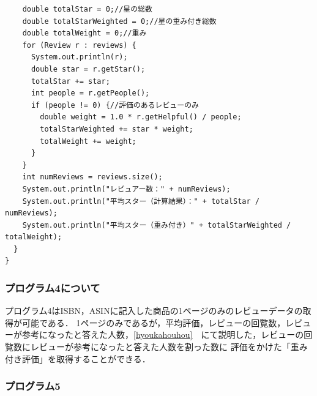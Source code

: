 \begin{lstlisting}
    double totalStar = 0;//星の総数
    double totalStarWeighted = 0;//星の重み付き総数
    double totalWeight = 0;//重み
    for (Review r : reviews) {
      System.out.println(r);
      double star = r.getStar();
      totalStar += star;
      int people = r.getPeople();
      if (people != 0) {//評価のあるレビューのみ
        double weight = 1.0 * r.getHelpful() / people;
        totalStarWeighted += star * weight;
        totalWeight += weight;
      }
    }
    int numReviews = reviews.size();
    System.out.println("レビュアー数：" + numReviews);
    System.out.println("平均スター（計算結果）：" + totalStar / numReviews);
    System.out.println("平均スター（重み付き）" + totalStarWeighted / totalWeight);
  }
}

\end{lstlisting}

\subsubsection{プログラム4について}

プログラム4はISBN，ASINに記入した商品の1ページのみのレビューデータの取得が可能である．
1ページのみであるが，平均評価，レビューの回覧数，レビューが参考になったと答えた人数，\ref{hyoukahouhou}　にて説明した，レビューの回覧数にレビューが参考になったと答えた人数を割った数に
評価をかけた「重み付き評価」を取得することができる．




\subsubsection{プログラム5}

